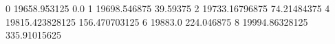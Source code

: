 0 19658.953125 0.0
1 19698.546875 39.59375
2 19733.16796875 74.21484375
4 19815.423828125 156.470703125
6 19883.0 224.046875
8 19994.86328125 335.91015625
